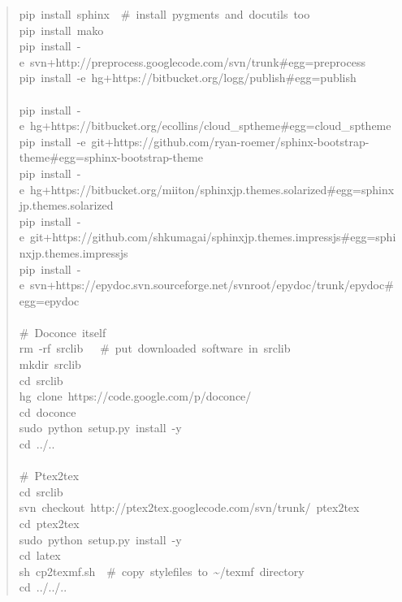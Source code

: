 \documentclass[a4paper]{article}
\begin{document}
\begin{quote}
{pip~install~sphinx~~\#~install~pygments~and~docutils~too\\
pip~install~mako\\
pip~install~-e~svn+http://preprocess.googlecode.com/svn/trunk\#egg=preprocess\\
pip~install~-e~hg+https://bitbucket.org/logg/publish\#egg=publish\\
~\\
pip~install~-e~hg+https://bitbucket.org/ecollins/cloud\_sptheme\#egg=cloud\_sptheme\\
pip~install~-e~git+https://github.com/ryan-roemer/sphinx-bootstrap-theme\#egg=sphinx-bootstrap-theme\\
pip~install~-e~hg+https://bitbucket.org/miiton/sphinxjp.themes.solarized\#egg=sphinxjp.themes.solarized\\
pip~install~-e~git+https://github.com/shkumagai/sphinxjp.themes.impressjs\#egg=sphinxjp.themes.impressjs\\
pip~install~-e~svn+https://epydoc.svn.sourceforge.net/svnroot/epydoc/trunk/epydoc\#egg=epydoc\\
~\\
\#~Doconce~itself\\
rm~-rf~srclib~~~\#~put~downloaded~software~in~srclib\\
mkdir~srclib\\
cd~srclib\\
hg~clone~https://code.google.com/p/doconce/\\
cd~doconce\\
sudo~python~setup.py~install~-y\\
cd~../..\\
~\\
\#~Ptex2tex\\
cd~srclib\\
svn~checkout~http://ptex2tex.googlecode.com/svn/trunk/~ptex2tex\\
cd~ptex2tex\\
sudo~python~setup.py~install~-y\\
cd~latex\\
sh~cp2texmf.sh~~\#~copy~stylefiles~to~\textasciitilde{}/texmf~directory\\
cd~../../..
}
\end{quote}
\end{document}

